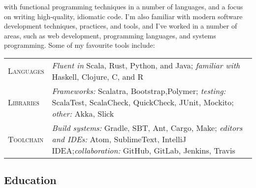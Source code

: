 \documentclass[a4paper]{tufte-handout}
\begin{document}
\begin{fullwidth}

\noindent
{} with functional programming techniques in a number of languages, and a focus on writing high-quality, idiomatic code. I'm also familiar with modern software development techniques, practices, and tools, and I've worked in a number of areas, such as web development, programming languages, and systems programming. Some of my favourite tools include: \\
    \footnotesize
\begin{tabular}{ l p{12.5cm} }

\textsc{Languages} & \emph{Fluent in} Scala, Rust, Python, and Java; \emph{familiar with} Haskell, Clojure, C, and R \\
\textsc{Libraries} & \emph{Frameworks:} Scalatra, Bootstrap,Polymer; \emph{testing:} ScalaTest, ScalaCheck, QuickCheck, JUnit, Mockito; \emph{other:} Akka, Slick \\
\textsc{Toolchain} & \emph{Build systems:} Gradle, SBT, Ant, Cargo, Make; \emph{editors and IDEs:} Atom, SublimeText, IntelliJ IDEA;\@ \emph{collaboration:} GitHub, GitLab, Jenkins, Travis
\end{tabular}
\end{fullwidth}

\subsection{Education}
\end{document}
